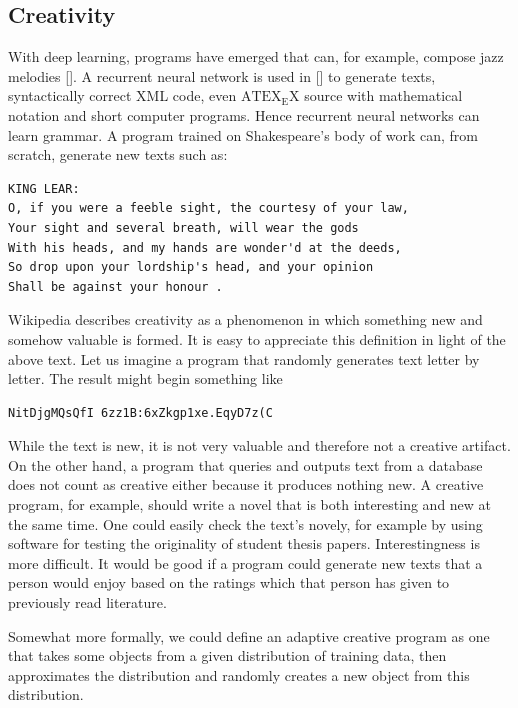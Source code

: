 \documentclass[10pt]{book}
\begin{document}
\subsection{Creativity}
With deep learning, programs have emerged that can, for example, compose jazz melodies [\cite{bickerman2010jazz}]. A recurrent neural network is used in [\cite{karpathy2015rnn}] to generate texts, syntactically correct XML code, even $\mathrm{ATEX}_{\mathrm{E}} \mathrm{X}$ source with mathematical notation and short computer programs. Hence recurrent neural networks can learn grammar. A program trained on Shakespeare's body of work can, from scratch, generate new texts such as:

\begin{verbatim}
KING LEAR:
O, if you were a feeble sight, the courtesy of your law,
Your sight and several breath, will wear the gods
With his heads, and my hands are wonder'd at the deeds,
So drop upon your lordship's head, and your opinion
Shall be against your honour .
\end{verbatim}

Wikipedia describes creativity as a phenomenon in which something new and somehow valuable is formed. It is easy to appreciate this definition in light of the above text. Let us imagine a program that randomly generates text letter by letter. The result might begin something like

\begin{verbatim}
NitDjgMQsQfI 6zz1B:6xZkgp1xe.EqyD7z(C
\end{verbatim}

While the text is new, it is not very valuable and therefore not a creative artifact. On the other hand, a program that queries and outputs text from a database does not count as creative either because it produces nothing new. A creative program, for example, should write a novel that is both interesting and new at the same time. One could easily check the text's novely, for example by using software for testing the originality of student thesis papers. Interestingness is more difficult. It would be good if a program could generate new texts that a person would enjoy based on the ratings which that person has given to previously read literature.

Somewhat more formally, we could define an adaptive creative program as one that takes some objects from a given distribution of training data, then approximates the distribution and randomly creates a new object from this distribution.
\end{document}
